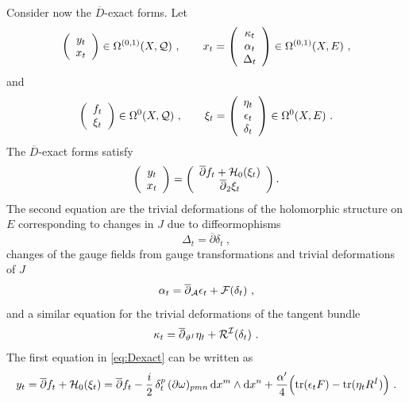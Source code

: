 \documentclass[12pt,a4paper]{article}
\def\bar#1{\overline{#1}}
\def\d{\textrm{d}}
\def\bp{\bar{\partial}}
\def\tr{\textrm{tr}}
\theoremstyle{definition}
\begin{document}
Consider now the $\bar D$-exact forms. Let
\begin{equation*}
\left( \begin{array}{c}
y_t \\ x_t
\end{array}\right)
\in \Omega^{(0,1)}(X, {\cal Q})~,\qquad
x_t = 
\left( \begin{array}{c}
\kappa_t \\ \alpha_t \\ \Delta_t
\end{array}\right)
\in \Omega^{(0,1)}(X, E)~,
\end{equation*}
and 
\begin{equation*}
\left( \begin{array}{c}
f_t \\ \xi_t
\end{array}\right)
\in \Omega^0(X, {\cal Q})~,\qquad
\xi_t  =  
\left( \begin{array}{c}
\eta_t \\ \epsilon_t \\ \delta_t
\end{array}\right)
\in \Omega^0(X, E)~.
\end{equation*}
The $\bar D$-exact forms satisfy
\begin{equation}
\left( \begin{array}{c}
 y_t \\ x_t
\end{array}\right)
=
\left( \begin{array}{cc}
\bp f_t + {\cal H}_0(\xi_t) \\
\bp_2  \xi_t \end{array} \right).\label{eq:Dexact}
\end{equation}
The second equation are the trivial deformations of the holomorphic structure on $E$ corresponding to changes in $J$ due to diffeormophisms
\[\Delta_t = \bp \delta_t~,\]  
changes of the gauge fields from gauge transformations and trivial deformations of $J$
\[  \alpha_t = \bp_{\cal A}\epsilon_t + {\cal F}(\delta_t)~,\]
and a similar equation for the trivial deformations of the tangent bundle
\[\kappa_t = \bp_{\vartheta^I}\eta_t + {\cal R^I}(\delta_t)~.\]
The first equation in \eqref{eq:Dexact} can be written as
\begin{equation}
y_t = \bp f_t + {\cal H}_0(\xi_t) = \bp f_t -\frac{i}{2}\, \delta_t^p \, (\partial \omega)_{pmn}\, \d x^m\wedge \d x^n + 
\frac{\alpha'}{4} \Big( \tr(\epsilon_t F) - \tr(\eta_t R^I)\Big)~. \label{eq:trivialy}
\end{equation}
\end{document}
